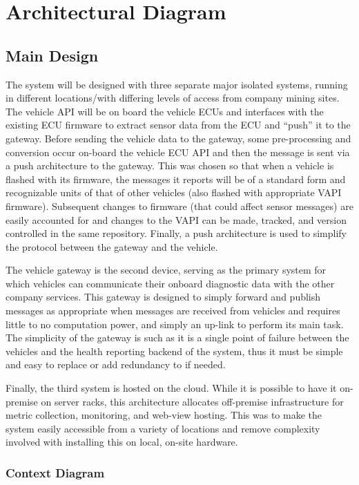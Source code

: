 \section{Architectural Diagram}

\subsection{Main Design}

The system will be designed with three separate major isolated systems, running in different locations/with differing levels of access from company mining sites. The vehicle API will be on board the vehicle ECUs and interfaces with the existing ECU firmware to extract sensor data from the ECU and ``push'' it to the gateway. Before sending the vehicle data to the gateway, some pre-processing and conversion occur on-board the vehicle ECU API and then the message is sent via a push architecture to the gateway. This was chosen so that when a vehicle is flashed with its firmware, the messages it reports will be of a standard form and recognizable units of that of other vehicles (also flashed with appropriate VAPI firmware). Subsequent changes to firmware (that could affect sensor messages) are easily accounted for and changes to the VAPI can be made, tracked, and version controlled in the same repository. Finally, a push architecture is used to simplify the protocol between the gateway and the vehicle.

The vehicle gateway is the second device, serving as the primary system for which vehicles can communicate their onboard diagnostic data with the other company services. This gateway is designed to simply forward and publish messages as appropriate when messages are received from vehicles and requires little to no computation power, and simply an up-link to perform its main task. The simplicity of the gateway is such as it is a single point of failure between the vehicles and the health reporting backend of the system, thus it must be simple and easy to replace or add redundancy to if needed.\newpage

Finally, the third system is hosted on the cloud. While it is possible to have it on-premise on server racks, this architecture allocates off-premise infrastructure for metric collection, monitoring, and web-view hosting. This was to make the system easily accessible from a variety of locations and remove complexity involved with installing this on local, on-site hardware.

\subsubsection{Context Diagram}

